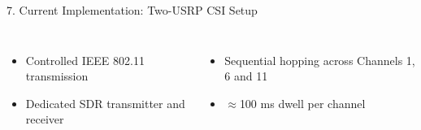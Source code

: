 \documentclass[aspectratio=169,11pt]{beamer}
\begin{document}
\begin{frame}{7. Current Implementation: Two-USRP CSI Setup}
\begin{center}
\begin{columns}[T,totalwidth=\textwidth]


\begin{itemize}
    \item Controlled IEEE 802.11 transmission
    \item Dedicated SDR transmitter and receiver
\end{itemize}


\begin{itemize}
    \item Sequential hopping across Channels 1, 6 and 11
    \item $\approx$100 ms dwell per channel
\end{itemize}

\end{columns}

\end{center}

\end{frame}

\end{document}
